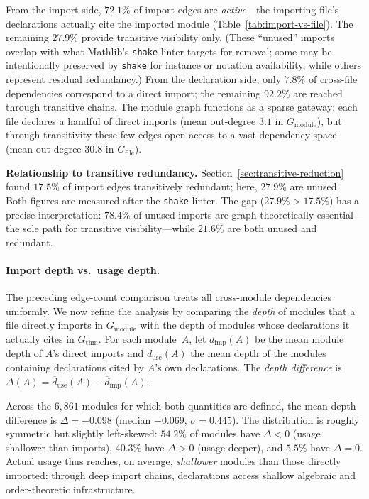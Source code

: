 From the import side, $72.1\%$ of import edges are \emph{active}---the importing file's declarations actually cite the imported module (Table~\ref{tab:import-vs-file}). The remaining $27.9\%$ provide transitive visibility only. (These ``unused'' imports overlap with what Mathlib's \texttt{shake} linter targets for removal; some may be intentionally preserved by \texttt{shake} for instance or notation availability, while others represent residual redundancy.) From the declaration side, only $7.8\%$ of cross-file dependencies correspond to a direct import; the remaining $92.2\%$ are reached through transitive chains. The module graph functions as a sparse gateway: each file declares a handful of direct imports (mean out-degree $3.1$ in $G_{\mathrm{module}}$), but through transitivity these few edges open access to a vast dependency space (mean out-degree $30.8$ in $G_{\mathrm{file}}$).

\noindent\textbf{Relationship to transitive redundancy.}
\label{rem:unused-vs-redundant}
Section~\ref{sec:transitive-reduction} found $17.5\%$ of import edges transitively redundant; here, $27.9\%$ are unused. Both figures are measured after the \texttt{shake} linter. The gap ($27.9\% > 17.5\%$) has a precise interpretation: $78.4\%$ of unused imports are graph-theoretically essential---the sole path for transitive visibility---while $21.6\%$ are both unused and redundant.

\paragraph{Import depth vs.\ usage depth.}

The preceding edge-count comparison treats all cross-module dependencies uniformly. We now refine the analysis by comparing the \emph{depth} of modules that a file directly imports in $G_{\mathrm{module}}$ with the depth of modules whose declarations it actually cites in $G_{\mathrm{thm}}$. For each module~$A$, let $\overline{d}_{\mathrm{imp}}(A)$ be the mean module depth of $A$'s direct imports and $\overline{d}_{\mathrm{use}}(A)$ the mean depth of the modules containing declarations cited by $A$'s own declarations. The \emph{depth difference} is $\Delta(A) = \overline{d}_{\mathrm{use}}(A) - \overline{d}_{\mathrm{imp}}(A)$.

Across the $6{,}861$ modules for which both quantities are defined, the mean depth difference is $\overline{\Delta} = -0.098$ (median $-0.069$, $\sigma = 0.445$). The distribution is roughly symmetric but slightly left-skewed: $54.2\%$ of modules have $\Delta < 0$ (usage shallower than imports), $40.3\%$ have $\Delta > 0$ (usage deeper), and $5.5\%$ have $\Delta = 0$. Actual usage thus reaches, on average, \emph{shallower} modules than those directly imported: through deep import chains, declarations access shallow algebraic and order-theoretic infrastructure.

